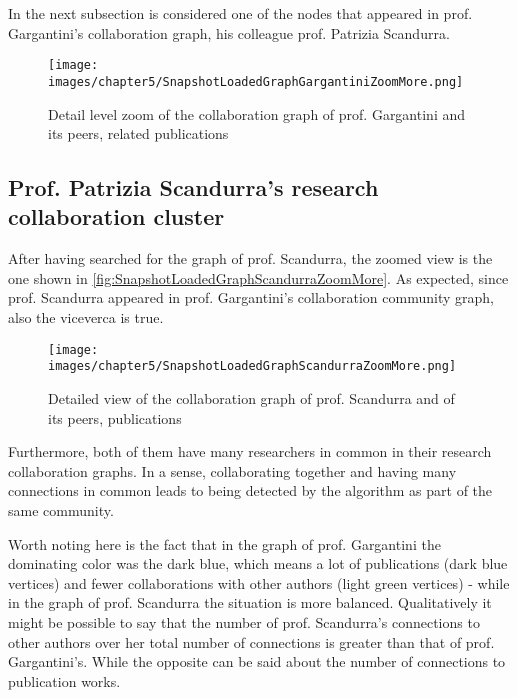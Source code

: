 In the next subsection is considered one of the nodes that appeared in prof. Gargantini's collaboration graph, his colleague prof. Patrizia Scandurra.

\begin{figure}[H]%
	\centering%
	\texttt{[image: images/chapter5/SnapshotLoadedGraphGargantiniZoomMore.png]}%
	\caption[Detail level zoom of the collaboration graph of prof. Gargantini and its peers, publications]{Detail level zoom of the collaboration graph of prof. Gargantini and its peers, related publications}%
	\label{fig:SnapshotLoadedGraphGargantiniZoomMore}%
\end{figure}%

\subsection{Prof. Patrizia Scandurra's research collaboration cluster} \label{subsection:Displayoftheresults/Indetailviewofthecollaborationgraph/ProfPatriziaScandurrasresearchcollaborationcluster}
After having searched for the graph of prof. Scandurra, the zoomed view is the one shown in \hyperref[fig:SnapshotLoadedGraphScandurraZoomMore]{\autoref{fig:SnapshotLoadedGraphScandurraZoomMore}}.
As expected, since prof. Scandurra appeared in prof. Gargantini's collaboration community graph, also the viceverca is true.

\begin{figure}[H]%
	\centering%
	\texttt{[image: images/chapter5/SnapshotLoadedGraphScandurraZoomMore.png]}%
	\caption[Detailed view of the collaboration graph of prof. Scandurra and of its peers, publications]{Detailed view of the collaboration graph of prof. Scandurra and of its peers, publications}%
	\label{fig:SnapshotLoadedGraphScandurraZoomMore}%
\end{figure}%

Furthermore, both of them have many researchers in common in their research collaboration graphs.
In a sense, collaborating together and having many connections in common leads to being detected by the algorithm as part of the same community.

Worth noting here is the fact that in the graph of prof. Gargantini the dominating color was the dark blue, which means a lot of publications (dark blue vertices) and fewer collaborations with other authors (light green vertices) - while in the graph of prof. Scandurra the situation is more balanced.
Qualitatively it might be possible to say that the number of prof. Scandurra's connections to other authors over her total number of connections is greater than that of prof. Gargantini's.
While the opposite can be said about the number of connections to publication works.

